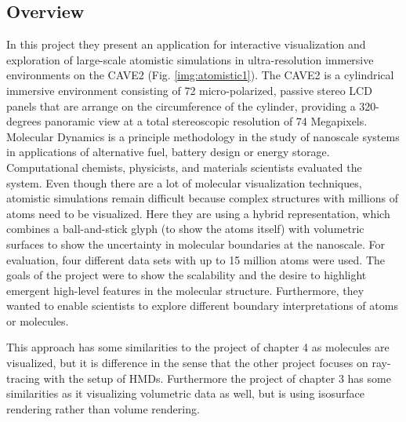 \documentclass[10pt,twocolumn,letterpaper]{article}
\begin{document}
\subsection{Overview}
In this project \cite{reda_visualizing_2013} they present an application for interactive visualization and exploration of large-scale atomistic simulations in ultra-resolution immersive environments on the CAVE2 \cite{febretti2013cave2} (Fig. \ref{img:atomistic1}). The CAVE2 is a cylindrical immersive environment consisting of 72 micro-polarized, passive stereo LCD panels that are arrange on the circumference of the cylinder, providing a 320-degrees panoramic view at a total stereoscopic resolution of 74 Megapixels. Molecular Dynamics is a principle methodology in the study of nanoscale systems in applications of alternative fuel, battery design or energy storage. Computational chemists, physicists, and materials scientists evaluated the system. Even though there are a lot of molecular visualization techniques, atomistic simulations remain difficult because complex structures with millions of atoms need to be visualized. Here they are using a hybrid representation, which combines a ball-and-stick glyph (to show the atoms itself) with volumetric surfaces to show the uncertainty in molecular boundaries at the nanoscale. For evaluation, four different data sets with up to 15 million atoms were used. The goals of the project were to show the scalability and the desire to highlight emergent high-level features in the molecular structure. Furthermore, they wanted to enable scientists to explore different boundary interpretations of atoms or molecules.

\setlength{\parindent}{1pc}This approach has some similarities to the project of chapter 4 as molecules are visualized, but it is difference in the sense that the other project focuses on ray-tracing with the setup of HMDs. Furthermore the project of chapter 3 has some similarities as it visualizing volumetric data as well, but is using isosurface rendering rather than volume rendering.
\end{document}
